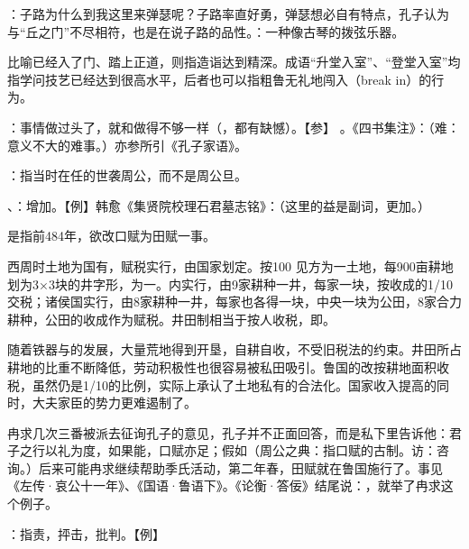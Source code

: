 {
\item {}：子路为什么到我这里来弹瑟呢？子路率直好勇，弹瑟想必自有特点，孔子认为与“丘之门”不尽相符，也是在说子路的品性。：一种像古琴的拨弦乐器。
\item {}比喻已经入了门、踏上正道，则指造诣达到精深。成语“升堂入室”、“登堂入室”均指学问技艺已经达到很高水平，后者也可以指粗鲁无礼地闯入（break in）的行为。
}
{}


{
\item {}：事情做过头了，就和做得不够一样（，都有缺憾）。【参】 。《四书集注》：（难：意义不大的难事。）亦参所引《孔子家语》。
}
{}  %


{
\item {}：指当时在任的世袭周公，而不是周公旦。
\item {}、：增加。【例】韩愈《集贤院校理石君墓志铭》：（这里的益是副词，更加。）

是指前484年，欲改口赋为田赋一事。

西周时土地为国有，赋税实行，由国家划定。按100 见方为一土地，每900亩耕地划为3×3块的井字形，为一。内实行，由9家耕种一井，每家一块，按收成的1/10交税；诸侯国实行，由8家耕种一井，每家也各得一块，中央一块为公田，8家合力耕种，公田的收成作为赋税。井田制相当于按人收税，即。

随着铁器与的发展，大量荒地得到开垦，自耕自收，不受旧税法的约束。井田所占耕地的比重不断降低，劳动积极性也很容易被私田吸引。鲁国的改按耕地面积收税，虽然仍是1/10的比例，实际上承认了土地私有的合法化。国家收入提高的同时，大夫家臣的势力更难遏制了。

冉求几次三番被派去征询孔子的意见，孔子并不正面回答，而是私下里告诉他：君子之行以礼为度，如果能，口赋亦足；假如（周公之典：指口赋的古制。访：咨询。）后来可能冉求继续帮助季氏活动，第二年春，田赋就在鲁国施行了。事见《左传·哀公十一年》、《国语·鲁语下》。《论衡·答佞》结尾说：，就举了冉求这个例子。

\item {}：指责，抨击，批判。【例】 
}
{}


